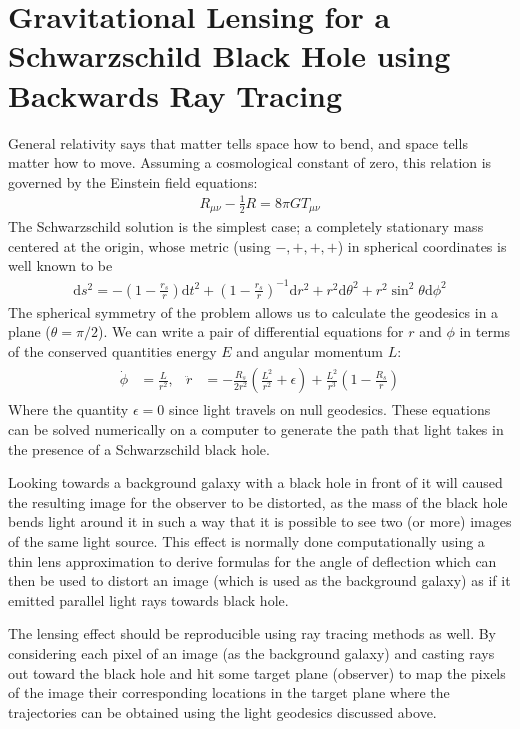 \documentclass{article}
\begin{document}
\section*{Gravitational Lensing for a Schwarzschild Black Hole using Backwards Ray Tracing}
	General relativity says that matter tells space how to bend, and space tells matter how to move. Assuming a cosmological constant of zero, this relation is governed by the Einstein field equations:
	\begin{align}
		R_{\mu\nu}-\frac{1}{2}R=8\pi G T_{\mu\nu}
	\end{align}
	The Schwarzschild solution is the simplest case; a completely stationary mass centered at the origin, whose metric (using \(-,+,+,+\)) in spherical coordinates is well known to be
	\begin{align}
		\mathrm{d}s^{2}=-\left(1-\frac{r_{s}}{r}\right)\mathrm{d}t^{2}+\left(1-\frac{r_{s}}{r}\right)^{-1}\mathrm{d}r^{2}+r^{2}\mathrm{d}\theta^{2}+r^{2}\sin^{2}\theta\mathrm{d}\phi^{2}
	\end{align}
	The spherical symmetry of the problem allows us to calculate the geodesics in a plane (\(\theta=\pi/2\)). We can write a pair of differential equations for \(r\) and \(\phi\) in terms of the conserved quantities energy \(E\) and angular momentum \(L\):
	\begin{align} \label{eq:eom}
		\begin{aligned}
			\dot{\phi}&=\frac{L}{r^{2}}, & \ddot{r}&=-\frac{R_{s}}{2r^{2}}\left(\frac{L^{2}}{r^{2}}+\epsilon\right)+\frac{L^{2}}{r^{3}}\left(1-\frac{R_{s}}{r}\right)
		\end{aligned}
	\end{align}
	Where the quantity \(\epsilon=0\) since light travels on null geodesics. These equations can be solved numerically on a computer to generate the path that light takes in the presence of a Schwarzschild black hole. 
	
	Looking towards a background galaxy with a black hole in front of it will caused the resulting image for the observer to be distorted, as the mass of the black hole bends light around it in such a way that it is possible to see two (or more) images of the same light source. This effect is normally done computationally using a thin lens approximation to derive formulas for the angle of deflection which can then be used to distort an image (which is used as the background galaxy) as if it emitted parallel light rays towards black hole.
	
	The lensing effect should be reproducible using ray tracing methods as well. By considering each pixel of an image (as the background galaxy) and casting rays out toward the black hole and hit some target plane (observer) to map the pixels of the image their corresponding locations in the target plane where the trajectories can be obtained using the light geodesics discussed above.
	
\end{document}
